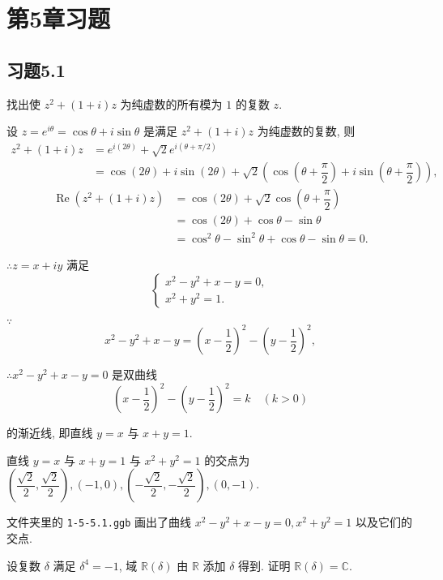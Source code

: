 \documentclass[UTF8]{ctexart}
\begin{document}
\section{第5章习题}
\subsection{习题5.1}
\begin{exercise}%
    找出使 $z^2+(1+i)z$ 为纯虚数的所有模为 $1$ 的复数 $z$.
\end{exercise}
\begin{solution}
    设 $z=e^{i\theta}=\cos\theta+i\sin\theta$ 是满足 $z^2+(1+i)z$ 为纯虚数的复数, 则
    \begin{align*}
        z^2+(1+i)z & =e^{i(2\theta)}+\sqrt{2}e^{i(\theta+\pi/2)} \\
        & =\cos(2\theta)+i\sin(2\theta)+\sqrt{2}\left(\cos\left(\theta+\dfrac{\pi}{2}\right)+i\sin\left(\theta+\dfrac{\pi}{2}\right)\right),
    \end{align*}
    \begin{align*}
        \operatorname{Re}(z^2+(1+i)z) & =\cos(2\theta)+\sqrt{2}\cos\left(\theta+\dfrac{\pi}{2}\right) \\
        & =\cos(2\theta)+\cos\theta-\sin\theta \\
        & =\cos^2\theta-\sin^2\theta+\cos\theta-\sin\theta=0.
    \end{align*}
    
    $\therefore z=x+iy$ 满足
    \[\begin{cases}
        x^2-y^2+x-y=0, \\
        x^2+y^2=1.
    \end{cases}\]

    $\because$
    \[x^2-y^2+x-y=\left(x-\dfrac{1}{2}\right)^2-\left(y-\dfrac{1}{2}\right)^2,\]

    $\therefore x^2-y^2+x-y=0$ 是双曲线
    \[\left(x-\dfrac{1}{2}\right)^2-\left(y-\dfrac{1}{2}\right)^2=k\quad(k>0)\]

    的渐近线, 即直线 $y=x$ 与 $x+y=1$.

    直线 $y=x$ 与 $x+y=1$ 与 $x^2+y^2=1$ 的交点为 $\left(\dfrac{\sqrt{2}}{2},\dfrac{\sqrt{2}}{2}\right),(-1,0),\left(-\dfrac{\sqrt{2}}{2},-\dfrac{\sqrt{2}}{2}\right),(0,-1)$.

    文件夹里的 \verb|1-5-5.1.ggb| 画出了曲线 $x^2-y^2+x-y=0,x^2+y^2=1$ 以及它们的交点.
\end{solution}
\begin{exercise}%
    设复数 $\delta$ 满足 $\delta^4=-1$, 域 $\mathbb{R}(\delta)$ 由 $\mathbb{R}$ 添加 $\delta$ 得到. 证明 $\mathbb{R}(\delta)=\mathbb{C}$.
\end{exercise}
\end{document}
